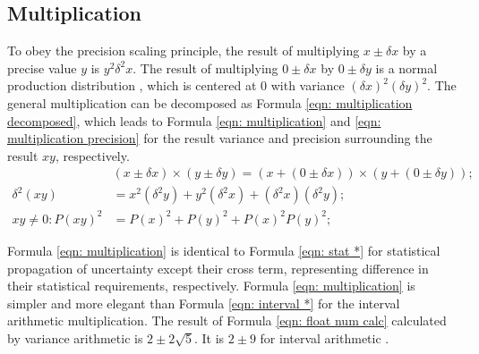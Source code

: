 \documentclass[twoside]{article}
\numberwithin{equation}{section}
\newcommand{\eqspace}{\;\;\;}
\begin{document}
\subsection{Multiplication}

To obey the precision scaling principle, the result of multiplying $x \pm \delta x$ by a precise value $y$ is $ y^2 \delta^2 x$.
The result of multiplying $0 \pm \delta x$ by $0 \pm \delta y$ is a normal production distribution \cite{Probability_Statistics}, which is centered at 0 with variance $(\delta x)^2 (\delta y)^2$.
The general multiplication can be decomposed as Formula \eqref{eqn: multiplication decomposed}, which leads to Formula \eqref{eqn: multiplication}  \cite{Prev_Precision_Arithmetic} and \eqref{eqn: multiplication precision}  \cite{Prev_Precision_Arithmetic} for the result variance and precision surrounding the result $xy$, respectively.
\begin{align}
\label{eqn: multiplication decomposed}
& (x \pm \delta x) \times (y \pm \delta y) = (x + (0 \pm \delta x)) \times (y + (0 \pm \delta y)); \\
\label{eqn: multiplication}
\delta^2 (x y) &= x^2 (\delta^2 y) + y^2 (\delta^2 x) + (\delta^2 x)(\delta^2 y); \\
\label{eqn: multiplication precision}
xy \neq 0: P(x y)^2 &= P(x)^2 + P(y)^2 + P(x)^2 P(y)^2;
\end{align}

Formula \eqref{eqn: multiplication} is identical to Formula \eqref{eqn: stat *} for statistical propagation of uncertainty except their cross term, representing difference in their statistical requirements, respectively.  
Formula \eqref{eqn: multiplication} is simpler and more elegant than Formula \eqref{eqn: interval *} for the interval arithmetic multiplication.  
The result of Formula \eqref{eqn: float num calc} calculated by variance arithmetic is $2 \pm 2\sqrt{5}$.
It is $2 \pm 9$ for interval arithmetic \cite{Worst_Case_Error_Bounds}.
\end{document}
